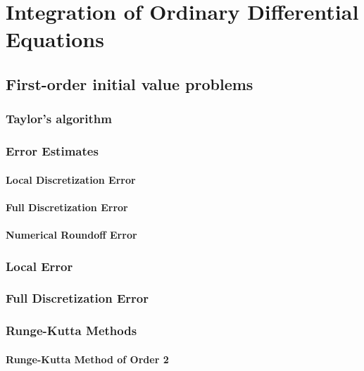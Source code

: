 \chapter{Integration of Ordinary Differential Equations}

\section{First-order initial value problems}

\subsection{Taylor's algorithm}

\subsection{Error Estimates}

\subsubsection{Local Discretization Error}

\subsubsection{Full Discretization Error}

\subsubsection{Numerical Roundoff Error}

\subsection{Local Error}

\subsection{Full Discretization Error}

\subsection{Runge-Kutta Methods}

\subsubsection{Runge-Kutta Method of Order 2}

